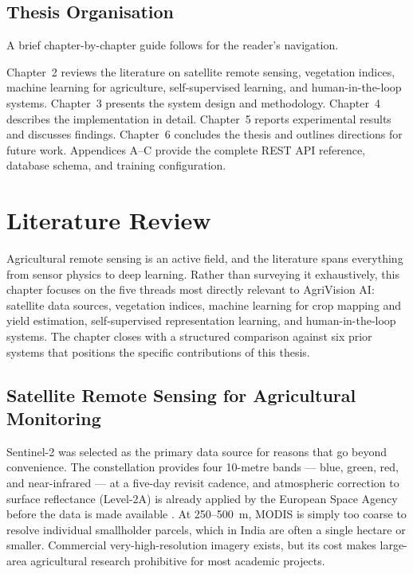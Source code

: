 \documentclass[12pt,a4paper,oneside]{report}
\begin{document}
\section{Thesis Organisation}

A brief chapter-by-chapter guide follows for the reader's navigation.

Chapter~2 reviews the literature on satellite remote sensing, vegetation indices,
machine learning for agriculture, self-supervised learning, and human-in-the-loop
systems. Chapter~3 presents the system design and methodology. Chapter~4 describes
the implementation in detail. Chapter~5 reports experimental results and discusses
findings. Chapter~6 concludes the thesis and outlines directions for future work.
Appendices A--C provide the complete REST API reference, database schema, and
training configuration.

\chapter{Literature Review}

Agricultural remote sensing is an active field, and the literature spans everything from sensor physics to deep learning. Rather than surveying it exhaustively, this chapter focuses on the five threads most directly relevant to AgriVision AI: satellite data sources, vegetation indices, machine learning for crop mapping and yield estimation, self-supervised representation learning, and human-in-the-loop systems. The chapter closes with a structured comparison against six prior systems that positions the specific contributions of this thesis.

\section{Satellite Remote Sensing for Agricultural Monitoring}

Sentinel-2 was selected as the primary data source for reasons that go beyond convenience. The constellation provides four 10-metre bands — blue, green, red, and near-infrared — at a five-day revisit cadence, and atmospheric correction to surface reflectance (Level-2A) is already applied by the European Space Agency before the data is made available \cite{drusch2012sentinel2}. At 250--500~m, MODIS is simply too coarse to resolve individual smallholder parcels, which in India are often a single hectare or smaller. Commercial very-high-resolution imagery exists, but its cost makes large-area agricultural research prohibitive for most academic projects.
\end{document}
